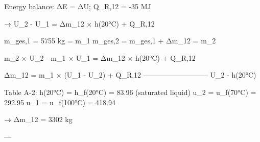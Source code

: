 Energy balance: ΔE = ΔU; Q_R,12 = -35 MJ  

→ U_2 - U_1 = Δm_12 × h(20°C) + Q_R,12  

m_ges,1 = 5755 kg = m_1  
m_ges,2 = m_ges,1 + Δm_12 = m_2  

m_2 × U_2 - m_1 × U_1 = Δm_12 × h(20°C) + Q_R,12  

Δm_12 = m_1 × (U_1 - U_2) + Q_R,12  
              ---------------------------  
                     U_2 - h(20°C)  

Table A-2:  
h(20°C) = h_f(20°C) = 83.96 (saturated liquid)  
u_2 = u_f(70°C) = 292.95  
u_1 = u_f(100°C) = 418.94  

→ Δm_12 = 3302 kg  

---